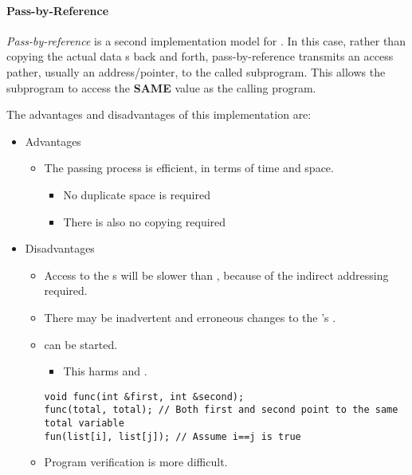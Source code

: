 \paragraph{Pass-by-Reference}\label{par:Parameter_Passing-Pass_By_Reference}
\begin{definition}\label{def:Pass_By_Reference}
  \emph{Pass-by-reference} is a second implementation model for .
  In this case, rather than copying the actual data s back and forth, pass-by-reference transmits an access pather, usually an address/pointer, to the called subprogram.
  This allows the subprogram to access the \textbf{SAME} value as the calling program.

  The advantages and disadvantages of this implementation are:
  \begin{itemize}[noitemsep]
  \item Advantages
    \begin{itemize}[noitemsep]
    \item The passing process is efficient, in terms of time and space.
      \begin{itemize}[noitemsep]
      \item No duplicate space is required
      \item There is also no copying required
      \end{itemize}
    \end{itemize}
  \item Disadvantages
    \begin{itemize}[noitemsep]
    \item Access to the s will be slower than , because of the indirect addressing required.
    \item There may be inadvertent and erroneous changes to the 's .
    \item {} can be started.
      \begin{itemize}[noitemsep]
      \item This harms  and .
      \end{itemize}
\begin{verbatim}
void func(int &first, int &second);
func(total, total); // Both first and second point to the same total variable
fun(list[i], list[j]); // Assume i==j is true
\end{verbatim}
    \item Program verification is more difficult.
    \end{itemize}
  \end{itemize}
\end{definition}

